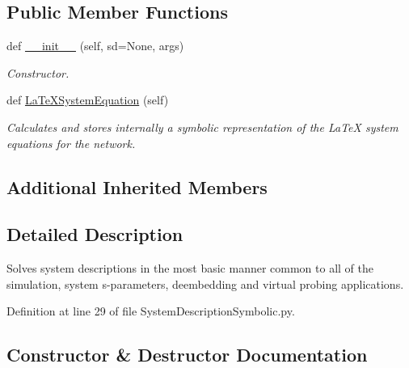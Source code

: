 \subsection*{Public Member Functions}
\begin{DoxyCompactItemize}
\item 
def \hyperlink{classSignalIntegrity_1_1SystemDescriptions_1_1SystemDescriptionSymbolic_1_1SystemDescriptionSymbolic_a72fa31992e716f60779f561f6cdbb4ce}{\+\_\+\+\_\+init\+\_\+\+\_\+} (self, sd=None, args)
\begin{DoxyCompactList}\small\item\em Constructor. \end{DoxyCompactList}\item 
def \hyperlink{classSignalIntegrity_1_1SystemDescriptions_1_1SystemDescriptionSymbolic_1_1SystemDescriptionSymbolic_ab91378c2a97ec0d38ee1c70988142eb5}{La\+Te\+X\+System\+Equation} (self)
\begin{DoxyCompactList}\small\item\em Calculates and stores internally a symbolic representation of the La\+TeX system equations for the network. \end{DoxyCompactList}\end{DoxyCompactItemize}
\subsection*{Additional Inherited Members}


\subsection{Detailed Description}
Solves system descriptions in the most basic manner common to all of the simulation, system s-\/parameters, deembedding and virtual probing applications. 



Definition at line 29 of file System\+Description\+Symbolic.\+py.



\subsection{Constructor \& Destructor Documentation}
\mbox{\label{classSignalIntegrity_1_1SystemDescriptions_1_1SystemDescriptionSymbolic_1_1SystemDescriptionSymbolic_a72fa31992e716f60779f561f6cdbb4ce}} 
